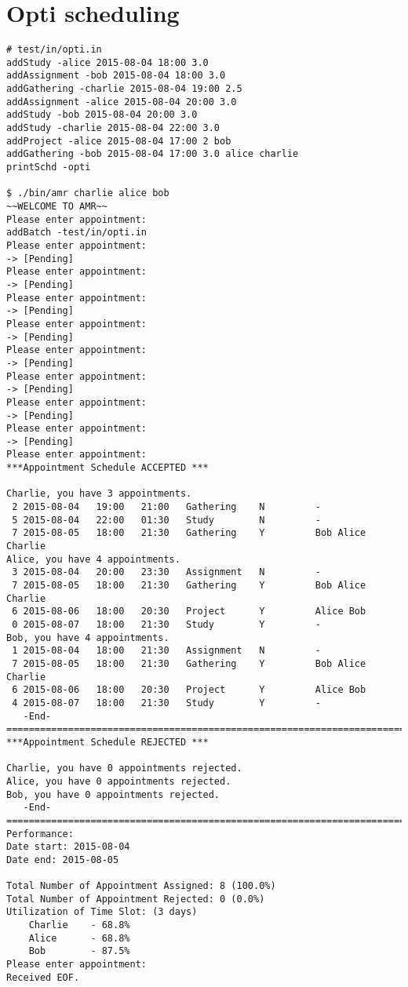 \documentclass[12pt,a4paper]{report}
\begin{document}
\section{Opti scheduling}
\begin{lstlisting}
# test/in/opti.in
addStudy -alice 2015-08-04 18:00 3.0
addAssignment -bob 2015-08-04 18:00 3.0
addGathering -charlie 2015-08-04 19:00 2.5
addAssignment -alice 2015-08-04 20:00 3.0
addStudy -bob 2015-08-04 20:00 3.0
addStudy -charlie 2015-08-04 22:00 3.0
addProject -alice 2015-08-04 17:00 2 bob
addGathering -bob 2015-08-04 17:00 3.0 alice charlie
printSchd -opti

$ ./bin/amr charlie alice bob
~~WELCOME TO AMR~~
Please enter appointment:
addBatch -test/in/opti.in
Please enter appointment:
-> [Pending]
Please enter appointment:
-> [Pending]
Please enter appointment:
-> [Pending]
Please enter appointment:
-> [Pending]
Please enter appointment:
-> [Pending]
Please enter appointment:
-> [Pending]
Please enter appointment:
-> [Pending]
Please enter appointment:
-> [Pending]
Please enter appointment:
***Appointment Schedule ACCEPTED ***

Charlie, you have 3 appointments.
 2 2015-08-04   19:00   21:00   Gathering    N         -
 5 2015-08-04   22:00   01:30   Study        N         -
 7 2015-08-05   18:00   21:30   Gathering    Y         Bob Alice Charlie 
Alice, you have 4 appointments.
 3 2015-08-04   20:00   23:30   Assignment   N         -
 7 2015-08-05   18:00   21:30   Gathering    Y         Bob Alice Charlie 
 6 2015-08-06   18:00   20:30   Project      Y         Alice Bob 
 0 2015-08-07   18:00   21:30   Study        Y         -
Bob, you have 4 appointments.
 1 2015-08-04   18:00   21:30   Assignment   N         -
 7 2015-08-05   18:00   21:30   Gathering    Y         Bob Alice Charlie 
 6 2015-08-06   18:00   20:30   Project      Y         Alice Bob 
 4 2015-08-07   18:00   21:30   Study        Y         -
   -End-
===========================================================================
***Appointment Schedule REJECTED ***

Charlie, you have 0 appointments rejected.
Alice, you have 0 appointments rejected.
Bob, you have 0 appointments rejected.
   -End-
===========================================================================
Performance:
Date start: 2015-08-04
Date end: 2015-08-05

Total Number of Appointment Assigned: 8 (100.0%)
Total Number of Appointment Rejected: 0 (0.0%)
Utilization of Time Slot: (3 days)
    Charlie    - 68.8%
    Alice      - 68.8%
    Bob        - 87.5%
Please enter appointment:
Received EOF.
\end{lstlisting}
\end{document}
